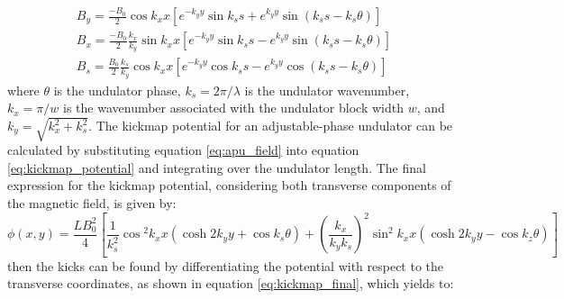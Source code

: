 \documentclass[a4paper,12pt]{article}
\begin{document}
\begin{equation}
    \begin{aligned}
        B_y = \frac{-B_0}{2}\cos{k_xx}\left[e^{-k_y y}\sin{k_s s} + e^{k_y y}\sin{(k_s s - k_s \theta)}\right]\\
        B_x = \frac{-B_0}{2}\frac{k_x}{k_y}\sin{k_xx}\left[e^{-k_y y}\sin{k_s s} - e^{k_y y}\sin{(k_s s - k_s \theta)}\right]\\
        B_s = \frac{B_0}{2}\frac{k_s}{k_y}\cos{k_xx}\left[e^{-k_y y}\cos{k_s s} - e^{k_y y}\cos{(k_s s - k_s \theta)}\right]
    \end{aligned}
    \label{eq:apu_field}
\end{equation}
where $\theta$ is the undulator phase, $k_s = 2\pi/\lambda$ is the undulator wavenumber,
$k_x = \pi/w$ is the wavenumber associated with the undulator block width $w$, and $k_y = \sqrt{k_x^2 + k_s^2}$.
The kickmap potential for an adjustable-phase undulator can be calculated by substituting equation \eqref{eq:apu_field} into equation \eqref{eq:kickmap_potential}
  and integrating over the undulator length. The final expression for the kickmap potential, considering both transverse components of the magnetic field, is given by:
  \begin{equation}
    \phi(x, y) = \frac{LB_0^2}{4}\left[\frac{1}{k_s^2}\cos{^2k_x x}\left(\cosh{2k_y y} + \cos{k_s \theta}\right) + (\frac{k_x}{k_y k_s})^2\sin^2{k_x x}\left(\cosh{2 k_y y} - \cos{k_z\theta}\right)\right]
    \label{eq:potential_apu}
\end{equation}
then the kicks can be found by differentiating the potential with respect to the transverse coordinates, as shown in equation \eqref{eq:kickmap_final}, which yields to:
\end{document}
